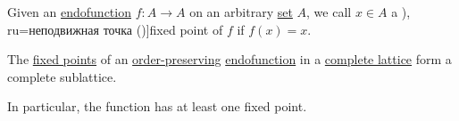 \begin{definition}\label{def:fixed_point}
  Given an \hyperref[def:function/endofunction]{endofunction} \( f: A \to A \) on an arbitrary \hyperref[def:set]{set} \( A \), we call \( x \in A \) a \term[bg=неподвижна точка (\cite[138]{Боянов2008}), ru=неподвижная точка (\cite[23]{Зорич2019Том1})]{fixed point} of \( f \) if \( f(x) = x \).
\end{definition}

\begin{theorem}\label{thm:knaster_tarski_theorem}
  The \hyperref[def:fixed_point]{fixed points} of an \hyperref[def:order_function]{order-preserving} \hyperref[def:function/endofunction]{endofunction} in a \hyperref[def:complete_lattice]{complete lattice} form a complete sublattice.
\end{theorem}
\begin{comments}
  \item In particular, the function has at least one fixed point.
\end{comments}
